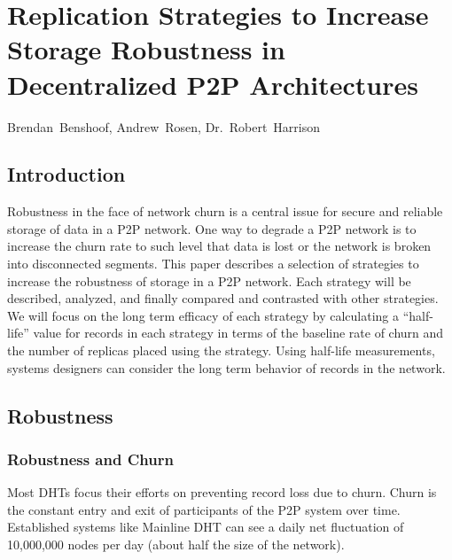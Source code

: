 \chapter{Replication Strategies to Increase Storage Robustness in Decentralized P2P Architectures}
%
%
%
\begin{center}
Brendan~Benshoof, Andrew~Rosen, Dr.~Robert~Harrison
\end{center}



\section{Introduction}

Robustness in the face of network churn is a central issue for secure and reliable storage of data in a P2P network. 
One way to degrade a P2P network is to increase the churn rate to such  level that data is lost or the network is broken into disconnected segments. 
This paper describes a selection of strategies to increase the robustness of storage in a P2P network.
Each strategy will be described, analyzed, and finally compared and contrasted with other strategies.
We will focus on the long term efficacy of each strategy by calculating a ``half-life'' value for records in each strategy in terms of the baseline rate of churn and the number of replicas placed using the strategy.
Using half-life measurements, systems designers can consider the long term behavior of records in the network.





\section{Robustness}

\subsection{Robustness and Churn}
Most DHTs focus their efforts on preventing record loss due to churn.
Churn is the constant entry and exit of participants of the P2P system over time.
Established systems like Mainline DHT can see a daily net fluctuation of 10,000,000 nodes per day \cite{wang2013measuring} (about half the size of the network). 

